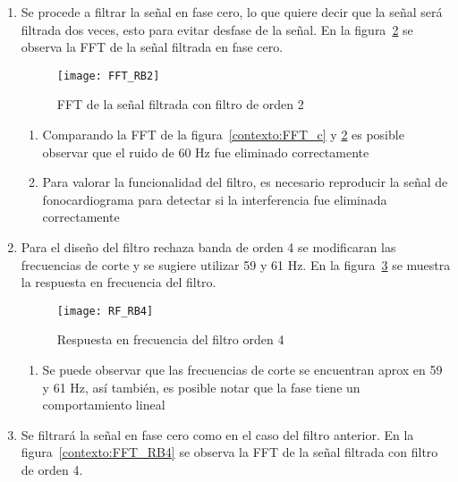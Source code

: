 \documentclass[10pt,letterpaper,spanish,twoside]{report}
\begin{document}
\begin{enumerate}
\begin{figure}[H]
 	\caption{Respuesta en frecuencia del filtro rechaza banda orden 2}
 	\label{contexto:RF_RB2}
 \end{figure}
 \begin{enumerate}
 	\item Se puede observar en puntos rojos que las frecuencias de corte se encuentran en 58 y 62 Hz.
 	\item En la gráfica de fase se puede observar que el desfase es lineal.
 \end{enumerate}
 \item Se procede a filtrar la señal en fase cero, lo que quiere decir que la señal será filtrada dos veces, esto para evitar desfase de la señal. En la figura~\ref{contexto:FFT_RB2} se observa la FFT de la señal filtrada en fase cero. 
 \begin{figure}[H]
	\centering
	\texttt{[image: FFT\_RB2]}
	\caption{FFT de la señal filtrada con filtro de orden 2}
	\label{contexto:FFT_RB2}
 \end{figure} 
 \begin{enumerate}
 	\item Comparando la FFT de la figura~\ref{contexto:FFT_c} y \ref{contexto:FFT_RB2} es posible observar que el ruido de 60 Hz fue eliminado correctamente 
 	\item Para valorar la funcionalidad del filtro, es necesario reproducir la señal de fonocardiograma para detectar si la interferencia fue eliminada correctamente
 \end{enumerate}  
 \item Para el diseño del filtro rechaza banda de orden 4 se modificaran las frecuencias de corte y se sugiere utilizar 59 y 61 Hz. En la figura~\ref{contexto:RF_RB4} se muestra la respuesta en frecuencia del filtro.
 \begin{figure}[H]
 	\centering
 	\texttt{[image: RF\_RB4]}
 	\caption{Respuesta en frecuencia del filtro orden 4}
 	\label{contexto:RF_RB4}
 \end{figure}
 \begin{enumerate}
 	\item Se puede observar que las frecuencias de corte se encuentran aprox en 59 y 61 Hz, así también, es posible notar que la fase tiene un comportamiento lineal
 \end{enumerate}
 \item Se filtrará la señal en fase cero como en el caso del filtro anterior. En la figura~\ref{contexto:FFT_RB4} se observa la FFT de la señal filtrada con filtro de orden 4.

\end{enumerate}
\end{document}
